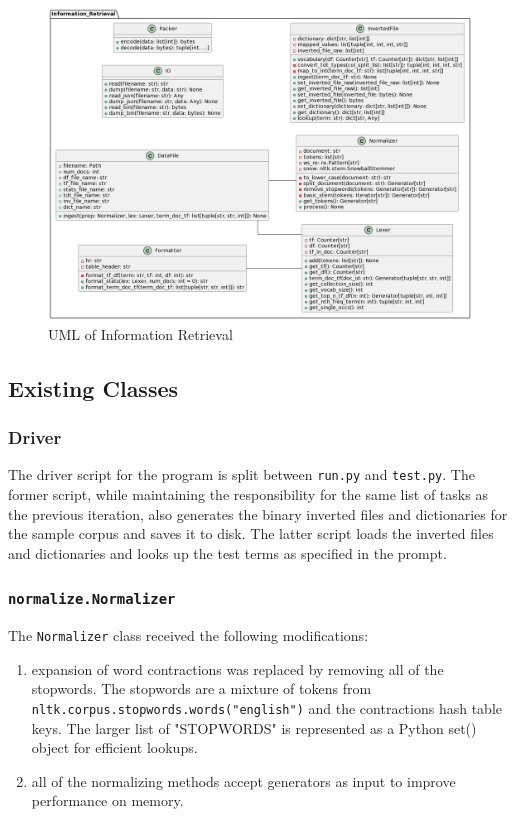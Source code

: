 \documentclass[11pt]{article}
\begin{document}
\begin{figure}[!ht]
    \includegraphics[scale=0.43]{statics/uml.png}
    \centering
    \caption{UML of Information Retrieval}
\end{figure}

\subsection{Existing Classes}

\subsubsection{Driver} \label{sec:driver}
The driver script for the program is split between \texttt{run.py} and \texttt{test.py}. The former script, while maintaining the responsibility for the same list of tasks as the previous iteration, also generates the binary inverted files and dictionaries for the sample corpus and saves it to disk. The latter script loads the inverted files and dictionaries and looks up the test terms as specified in the prompt.

\subsubsection{\texttt{normalize.Normalizer}}
The \texttt{Normalizer} class received the following modifications:

\begin{enumerate}
    \item expansion of word contractions was replaced by removing all of the stopwords. The stopwords are a mixture of tokens from \texttt{nltk.corpus.stopwords.words("english")} and the contractions hash table keys. The larger list of "STOPWORDS" is represented as a Python set() object for efficient lookups.

    \item all of the normalizing methods accept generators as input to improve performance on memory.
\end{enumerate}
\end{document}

